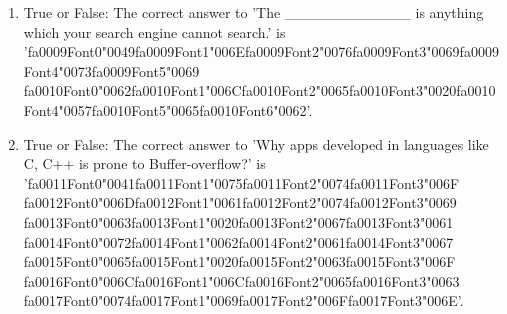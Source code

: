 \documentclass[12pt]{article}
\begin{document}
\begin{enumerate}[label=\arabic*.]
\item True or False: The correct answer to 'The \_\_\_\_\_\_\_\_\_\_\_\_ is anything which your search engine cannot search.' is '{\csname fa0009Font0\endcsname\char"0049}{\csname fa0009Font1\endcsname\char"006E}{\csname fa0009Font2\endcsname\char"0076}{\csname fa0009Font3\endcsname\char"0069}{\csname fa0009Font4\endcsname\char"0073}{\csname fa0009Font5\endcsname\char"0069} {\csname fa0010Font0\endcsname\char"0062}{\csname fa0010Font1\endcsname\char"006C}{\csname fa0010Font2\endcsname\char"0065}{\csname fa0010Font3\endcsname\char"0020}{\csname fa0010Font4\endcsname\char"0057}{\csname fa0010Font5\endcsname\char"0065}{\csname fa0010Font6\endcsname\char"0062}'.
\item True or False: The correct answer to 'Why apps developed in languages like C, C++ is prone to Buffer-overflow?' is '{\csname fa0011Font0\endcsname\char"0041}{\csname fa0011Font1\endcsname\char"0075}{\csname fa0011Font2\endcsname\char"0074}{\csname fa0011Font3\endcsname\char"006F} {\csname fa0012Font0\endcsname\char"006D}{\csname fa0012Font1\endcsname\char"0061}{\csname fa0012Font2\endcsname\char"0074}{\csname fa0012Font3\endcsname\char"0069} {\csname fa0013Font0\endcsname\char"0063}{\csname fa0013Font1\endcsname\char"0020}{\csname fa0013Font2\endcsname\char"0067}{\csname fa0013Font3\endcsname\char"0061} {\csname fa0014Font0\endcsname\char"0072}{\csname fa0014Font1\endcsname\char"0062}{\csname fa0014Font2\endcsname\char"0061}{\csname fa0014Font3\endcsname\char"0067} {\csname fa0015Font0\endcsname\char"0065}{\csname fa0015Font1\endcsname\char"0020}{\csname fa0015Font2\endcsname\char"0063}{\csname fa0015Font3\endcsname\char"006F} {\csname fa0016Font0\endcsname\char"006C}{\csname fa0016Font1\endcsname\char"006C}{\csname fa0016Font2\endcsname\char"0065}{\csname fa0016Font3\endcsname\char"0063} {\csname fa0017Font0\endcsname\char"0074}{\csname fa0017Font1\endcsname\char"0069}{\csname fa0017Font2\endcsname\char"006F}{\csname fa0017Font3\endcsname\char"006E}'.

\end{enumerate}
\end{document}
